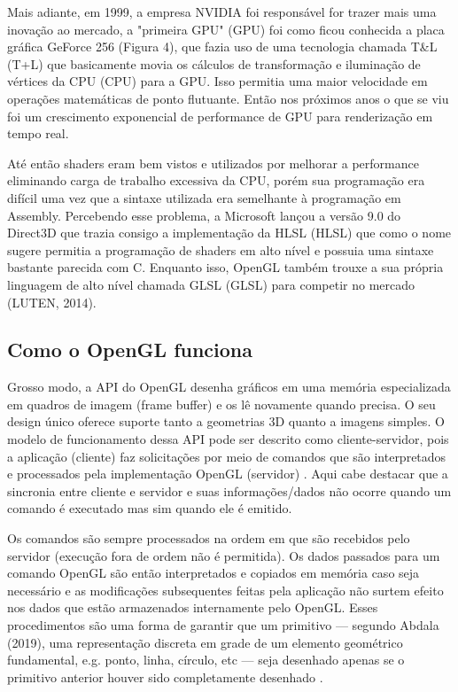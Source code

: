 Mais adiante, em 1999, a empresa NVIDIA foi responsável for trazer mais uma inovação ao mercado, a "primeira GPU" (\acrlong{GPU}) foi como ficou conhecida a placa gráfica GeForce 256 (Figura 4), que fazia uso de uma tecnologia chamada T\&L (\acrlong{T+L}) que basicamente movia os cálculos de transformação e iluminação de vértices da CPU (\acrlong{CPU}) para a \acrshort{GPU}. Isso permitia uma maior velocidade em operações matemáticas de ponto flutuante. Então nos próximos anos o que se viu foi um crescimento exponencial de performance de \acrshort{GPU} para renderização em tempo real.

Até então shaders eram bem vistos e utilizados por melhorar a performance eliminando carga de trabalho excessiva da \acrshort{CPU}, porém sua programação era difícil uma vez que a sintaxe utilizada era semelhante à programação em Assembly. Percebendo esse problema, a Microsoft lançou a versão 9.0 do Direct3D que trazia consigo a implementação da HLSL (\acrlong{HLSL}) que como o nome sugere permitia a programação de shaders em alto nível e possuia uma sintaxe bastante parecida com C. Enquanto isso, OpenGL também trouxe a sua própria linguagem de alto nível chamada GLSL (\acrlong{GLSL}) para competir no mercado (LUTEN, 2014)\nocite{openGLBook}. 

\subsection{Como o OpenGL funciona}
\label{sec:como-opengl-funciona}

Grosso modo, a API do OpenGL desenha gráficos em uma memória especializada em quadros de imagem (frame buffer) e os lê novamente quando precisa. O seu design único oferece suporte tanto a geometrias 3D quanto a imagens simples. O modelo de funcionamento dessa API pode ser descrito como cliente-servidor, pois a aplicação (cliente) faz solicitações por meio de comandos que são interpretados e processados pela implementação OpenGL (servidor) \cite{GLSLBook}. Aqui cabe destacar que a sincronia entre cliente e servidor e suas informações/dados não ocorre quando um comando é executado mas sim quando ele é emitido.

Os comandos são sempre processados na ordem em que são recebidos pelo servidor (execução fora de ordem não é permitida). Os dados passados para um comando OpenGL são então interpretados e copiados em memória caso seja necessário e as modificações subsequentes feitas pela aplicação não surtem efeito nos dados que estão armazenados internamente pelo OpenGL. Esses procedimentos são uma forma de garantir que um primitivo --- segundo Abdala (2019)\nocite{abdala}, uma representação discreta em grade de um elemento geométrico fundamental, e.g. ponto, linha, círculo, etc --- seja desenhado apenas se o primitivo anterior houver sido completamente desenhado \cite{GLSLBook}.

